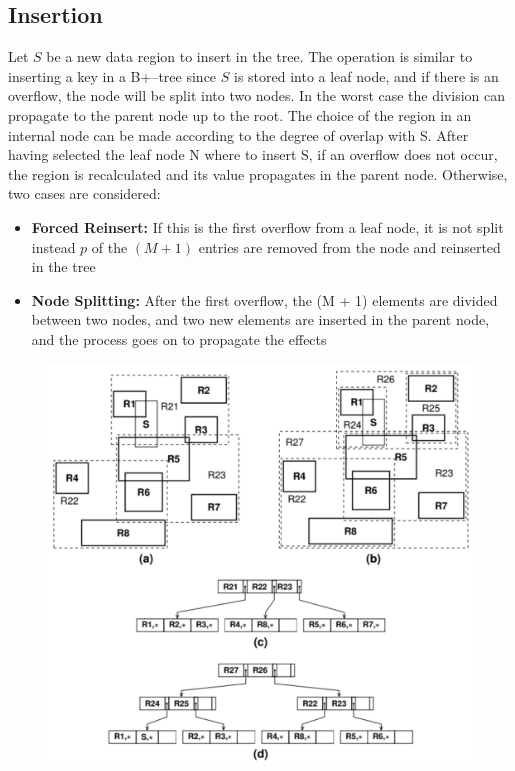 \subsection{Insertion}
Let $S$ be a new data region to insert in the tree. The operation is similar to inserting a key in a B+–tree since $S$ is stored into a leaf node, and if there is an overflow, the node will be split into two nodes. In the worst case the division can propagate to the parent node up to the root. The choice of the region in an internal node can be made according to the degree of overlap with S. After having selected the leaf node N where to insert S, if an overflow does not occur, the region is recalculated and its value propagates in the parent node. Otherwise, two cases are considered:
\begin{itemize}
    \item \textbf{Forced Reinsert:} If this is the first overflow from a leaf node, it is not split  instead $p$ of the $(M + 1)$ entries are removed from the node and reinserted in the tree
    \item \textbf{Node Splitting:} After the first overflow, the (M + 1) elements are divided between two nodes, and two new elements are inserted in the parent node, and the process goes on to propagate the effects
\end{itemize}
\begin{figure}[h]
\centering
\includegraphics[width=.5\linewidth]{images/DBMS_Internals/MultiDimensionalDataOrganizations/r+tree3.jpeg}
\end{figure}